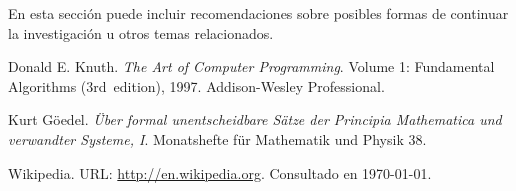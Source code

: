\documentclass[a4paper,10pt]{article}
\begin{document}
  En esta sección puede incluir recomendaciones sobre posibles formas de continuar
  la investigación u otros temas relacionados.




\begin{thebibliography}{99}
	 Donald E. Knuth. \emph{The Art of Computer Programming}.
		Volume 1: Fundamental Algorithms (3rd~edition), 1997.
		Addison-Wesley Professional.

	 Kurt Göedel. \emph{Über formal unentscheidbare Sätze der
		Principia Mathematica und verwandter Systeme, I}.
		Monatshefte für Mathematik und Physik 38.

	 Wikipedia. URL: \href{http://en.wikipedia.org}
	  {http://en.wikipedia.org}.
		Consultado en \today.

\end{thebibliography}


\label{end}
\end{document}
